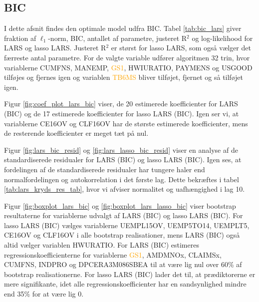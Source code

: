 \subsection{BIC}
I dette afsnit findes den optimale model udfra BIC.
Tabel \ref{tab:bic_lars} giver fraktion af \(\ell_1\)-norm, BIC, antallet af parametre, justeret R$^2$ og log-likelihood for LARS og lasso LARS.
Justeret R$^2$ er størst for lasso LARS, som også vælger det færreste antal parametre. 
 For de valgte variable udfører algoritmen 32 trin, hvor variablerne \textcolor{chartreuse4}{CUMFNS}, \textcolor{blue3}{MANEMP}, \textcolor{orange}{GS1}, \textcolor{blue3}{HWIURATIO}, \textcolor{blue3}{PAYMENS} og \textcolor{blue3}{USGOOD} tilføjes og fjernes igen og variablen \textcolor{orange}{TB6MS} bliver tilføjet, fjernet og så tilføjet igen. 




Figur \ref{fig:coef_plot_lars_bic} viser, de 20 estimerede koefficienter for LARS (BIC) og de 17 estimerede koefficienter for lasso LARS (BIC).  
Igen ser vi, at  variablerne \textcolor{blue3}{CE16OV} og \textcolor{blue3}{CLF16OV} har de største estimerede koefficienter, mens de resterende koefficienter er meget tæt på nul. 



Figur \ref{fig:lars_bic_resid} og \ref{fig:lars_lasso_bic_resid} viser en analyse af de standardiserede residualer for LARS (BIC) og lasso LARS (BIC). 
Igen ses, at fordelingen af de standardiserede residualer har tungere haler end normalfordelingen og autokorrelation i det første lag. 
Dette bekræftes i tabel \ref{tab:lars_kryds_res_tab}, hvor vi afviser normalitet og uafhængighed i lag 10.

Figur \ref{fig:boxplot_lars_bic} og \ref{fig:boxplot_lars_lasso_bic} viser bootstrap resultaterne for variablerne udvalgt af LARS (BIC) og lasso LARS (BIC). 
For lasso LARS (BIC) vælges variablerne \textcolor{blue3}{UEMPL15OV}, \textcolor{blue3}{UEMP5TO14}, \textcolor{blue3}{UEMPLT5}, \textcolor{blue3}{CE16OV} og \textcolor{blue3}{CLF16OV} i alle bootstrap realisationer, mens LARS (BIC) også altid vælger variablen \textcolor{blue3}{HWURATIO}.
For LARS (BIC) estimeres regressionskoefficienterne for variablerne \textcolor{orange}{GS1}, \textcolor{red3}{AMDMNOx}, \textcolor{blue3}{CLAIMSx}, \textcolor{chartreuse4}{CUMFNS}, \textcolor{chartreuse4}{INDPRO} og \textcolor{red3}{DPCERA3M086SBEA} til at være lig nul over 60\% af bootstrap realisationerne.
For lasso LARS (BIC) lader det til, at prædiktorerne er mere signifikante, idet alle regressionskoefficienter har en sandsynlighed mindre end 35\% for at være lig 0. 

